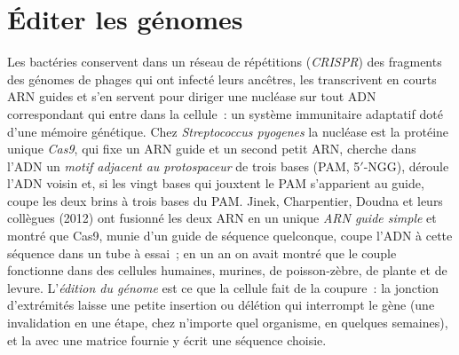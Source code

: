 \section{Éditer les génomes}

\begin{definition}\label{def:b3:genetic-engineering:crispr}
Les bactéries conservent dans un réseau de répétitions (\emph{CRISPR})
des fragments des génomes de phages qui ont infecté leurs ancêtres, les
transcrivent en courts ARN guides et s'en servent pour diriger une
nucléase sur tout ADN correspondant qui entre dans la cellule~: un
système immunitaire adaptatif doté d'une mémoire génétique. Chez
\emph{Streptococcus pyogenes} la nucléase est la protéine unique
\emph{Cas9}, qui fixe un ARN guide et un second petit ARN, cherche dans
l'ADN un \emph{motif adjacent au protospaceur} de trois bases (PAM,
5$'$-NGG), déroule l'ADN voisin et, si les vingt bases qui jouxtent le
PAM s'apparient au guide, coupe les deux brins à trois bases du PAM.
Jinek, Charpentier, Doudna et leurs collègues (2012) ont fusionné les
deux ARN en un unique \emph{ARN guide simple} et montré que Cas9, munie
d'un guide de séquence quelconque, coupe l'ADN à cette séquence dans un
tube à essai~; en un an on avait montré que le couple fonctionne dans
des cellules humaines, murines, de poisson-zèbre, de plante et de
levure. L'\emph{édition du génome} est ce que la cellule fait de la
coupure~: la jonction d'extrémités laisse une petite insertion ou
délétion qui interrompt le gène (une invalidation en une étape, chez
n'importe quel organisme, en quelques semaines), et la  avec une matrice fournie y écrit une séquence choisie.
\end{definition}

